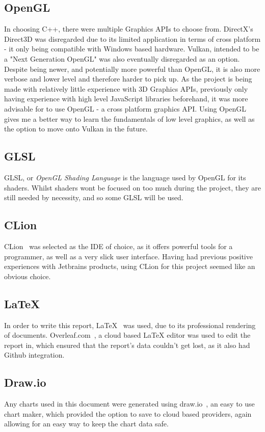 \documentclass[a4paper,10pt]{report}
\begin{document}
\subsection{OpenGL}
In choosing C++, there were multiple Graphics APIs to choose from. DirectX's Direct3D was disregarded due to its limited application in terms of cross platform - it only being compatible with Windows based hardware. Vulkan, intended to be a "Next Generation OpenGL" was also eventually disregarded as an option. Despite being newer, and potentially more powerful than OpenGL, it is also more verbose and lower level and therefore harder to pick up. As the project is being made with relatively little experience with 3D Graphics APIs, previously only having experience with  high level JavaScript libraries beforehand, it was more advisable for to use OpenGL - a cross platform graphics API. Using OpenGL gives me a better way to learn the fundamentals of low level graphics, as well as the option to move onto Vulkan in the future.

\subsection{GLSL}

GLSL, or \textit{OpenGL Shading Language} is the language used by OpenGL for its shaders. Whilst shaders wont be focused on too much during the project, they are still needed by necessity, and so some GLSL will be used.

\subsection{CLion}
CLion~\cite{clion_jetbrains} was selected as the IDE of choice, as it offers powerful tools for a programmer, as well as a very slick user interface. Having had previous positive experiences with Jetbrains products, using CLion for this project seemed like an obvious choice.

\subsection{LaTeX}
In order to write this report, LaTeX~\cite{latex_website} was used, due to its professional rendering of documents. Overleaf.com~\cite{overleaf_website}, a cloud based LaTeX editor was used to edit the report in, which ensured that the report's data couldn't get lost, as it also had Github integration.

\subsection{Draw.io}
Any charts used in this document were generated using draw.io~\cite{draw_io}, an easy to use chart maker, which provided the option to save to cloud based providers, again allowing for an easy way to keep the chart data safe. 
\end{document}
